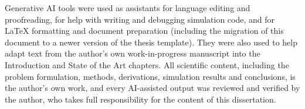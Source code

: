 \begin{AIDcomment*}
Generative AI tools were used as assistants for language editing and
proofreading, for help with writing and debugging simulation code, and for
\LaTeX{} formatting and document preparation (including the migration of this
document to a newer version of the thesis template). They were
also used to help adapt text from the author's own work-in-progress
manuscript into the Introduction and State of the Art chapters. All
scientific content, including the problem formulation, methods, derivations,
simulation results and conclusions, is the author's own work, and every
AI-assisted output was reviewed and verified by the author, who takes full
responsibility for the content of this dissertation.
\end{AIDcomment*}




